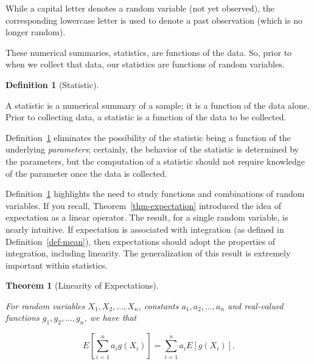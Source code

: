 \documentclass[
  letterpaper,
  DIV=11,
  numbers=noendperiod]{scrreprt}
\theoremstyle{definition}
\newtheorem{definition}{Definition}[chapter]
\theoremstyle{definition}
\theoremstyle{plain}
\newtheorem{theorem}{Theorem}[chapter]
\theoremstyle{remark}
\begin{document}
\begin{tcolorbox}[enhanced jigsaw, title=\textcolor{quarto-callout-note-color}{\faInfo}\hspace{0.5em}{Note}, colbacktitle=quarto-callout-note-color!10!white, titlerule=0mm, toptitle=1mm, breakable, bottomtitle=1mm, colframe=quarto-callout-note-color-frame, opacitybacktitle=0.6, bottomrule=.15mm, arc=.35mm, toprule=.15mm, colback=white, rightrule=.15mm, coltitle=black, leftrule=.75mm, left=2mm, opacityback=0]

While a capital letter denotes a random variable (not yet observed), the
corresponding lowercase letter is used to denote a past observation
(which is no longer random).

\end{tcolorbox}

These numerical summaries, statistics, are functions of the data. So,
prior to when we collect that data, our statistics are functions of
random variables.

\begin{definition}[Statistic]\protect\hypertarget{def-statistic}{}\label{def-statistic}

A statistic is a numerical summary of a sample; it is a function of the
data alone. Prior to collecting data, a statistic is a function of the
data to be collected.

\end{definition}

Definition~\ref{def-statistic} eliminates the possibility of the
statistic being a function of the underlying \emph{parameters};
certainly, the behavior of the statistic is determined by the
parameters, but the computation of a statistic should not require
knowledge of the parameter once the data is collected.

Definition~\ref{def-statistic} highlights the need to study functions
and combinations of random variables. If you recall,
Theorem~\ref{thm-expectation} introduced the idea of expectation as a
linear operator. The result, for a single random variable, is nearly
intuitive. If expectation is associated with integration (as defined in
Definition~\ref{def-mean}), then expectations should adopt the
properties of integration, including linearity. The generalization of
this result is extremely important within statistics.

\begin{theorem}[Linearity of
Expectations]\protect\hypertarget{thm-linearity-of-expectations}{}\label{thm-linearity-of-expectations}

For random variables \(X_1, X_2, \dotsc, X_n\), constants
\(a_1, a_2, \dotsc, a_n\) and real-valued functions
\(g_1, g_2, \dotsc, g_n\), we have that

\[E\left[\sum_{i=1}^{n} a_i g\left(X_i\right)\right] = \sum_{i=1}^{n} a_i E\left[g\left(X_i\right)\right].\]

\end{theorem}
\end{document}
